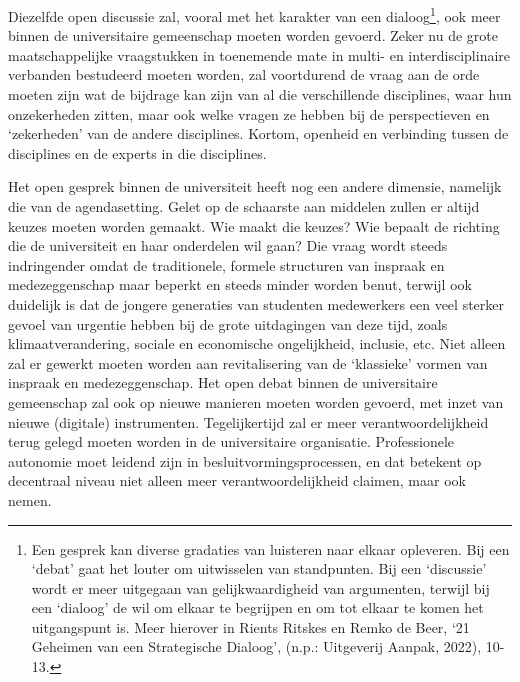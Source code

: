 \documentclass[smallauthor, chapterhaspagenum, nochapterinheader, pagenuminheader,  bigchapnum,medium2, tocpages,  garamond, titleinheader]{jote-book}
\begin{document}
	Diezelfde open discussie zal, vooral met het karakter van een dialoog\footnote{Een gesprek kan diverse gradaties van luisteren naar elkaar opleveren. Bij een ‘debat' gaat het louter om uitwisselen van standpunten. Bij een ‘discussie' wordt er meer uitgegaan van gelijkwaardigheid van argumenten, terwijl bij een ‘dialoog' de wil om elkaar te begrijpen en om tot elkaar te komen het uitgangspunt is. Meer hierover in Rients Ritskes en Remko de Beer, ‘21 Geheimen van een Strategische Dialoog', (n.p.: Uitgeverij Aanpak, 2022), 10-13.}, ook meer binnen de universitaire gemeenschap moeten worden gevoerd. Zeker nu de grote maatschappelijke vraagstukken in toenemende mate in multi- en interdisciplinaire verbanden bestudeerd moeten worden, zal voortdurend de vraag aan de orde moeten zijn wat de bijdrage kan zijn van al die verschillende disciplines, waar hun onzekerheden zitten, maar ook welke vragen ze hebben bij de perspectieven en ‘zekerheden' van de andere disciplines. Kortom, openheid en verbinding tussen de disciplines en de experts in die disciplines.



	Het open gesprek binnen de universiteit heeft nog een andere dimensie, namelijk die van de agendasetting. Gelet op de schaarste aan middelen zullen er altijd keuzes moeten worden gemaakt. Wie maakt die keuzes? Wie bepaalt de richting die de universiteit en haar onderdelen wil gaan? Die vraag wordt steeds indringender omdat de traditionele, formele structuren van inspraak en medezeggenschap maar beperkt en steeds minder worden benut, terwijl ook duidelijk is dat de jongere generaties van studenten medewerkers een veel sterker gevoel van urgentie hebben bij de grote uitdagingen van deze tijd, zoals klimaatverandering, sociale en economische ongelijkheid, inclusie, etc. Niet alleen zal er gewerkt moeten worden aan revitalisering van de ‘klassieke' vormen van inspraak en medezeggenschap. Het open debat binnen de universitaire gemeenschap zal ook op nieuwe manieren moeten worden gevoerd, met inzet van nieuwe (digitale) instrumenten. Tegelijkertijd zal er meer verantwoordelijkheid terug gelegd moeten worden in de universitaire organisatie. Professionele autonomie moet leidend zijn in besluitvormingsprocessen, en dat betekent op decentraal niveau niet alleen meer verantwoordelijkheid claimen, maar ook nemen.
\end{document}
